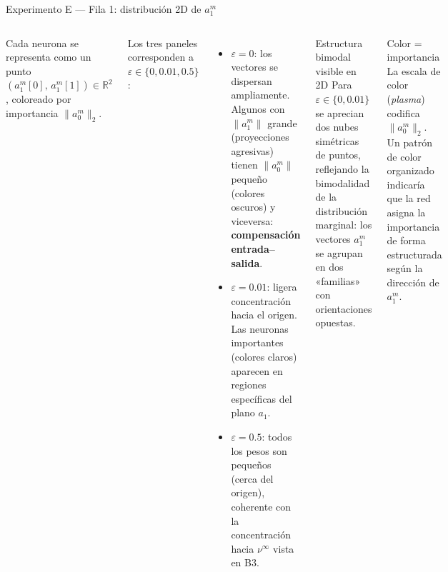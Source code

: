 \documentclass[10pt]{beamer}
\begin{document}
\begin{frame}{Experimento E — Fila 1: distribución 2D de $a_1^m$}

\begin{columns}

Cada neurona se representa como un punto $(a_1^m[0],\, a_1^m[1])\in\mathbb{R}^2$, coloreado por importancia $\|a_0^m\|_2$.

\medskip
Los tres paneles corresponden a $\varepsilon\in\{0, 0.01, 0.5\}$:

\begin{itemize}
  \item \textbf{$\varepsilon=0$}: los vectores se dispersan ampliamente. Algunos con $\|a_1^m\|$ grande (proyecciones agresivas) tienen $\|a_0^m\|$ pequeño (colores oscuros) y viceversa: \textbf{compensación entrada–salida}.
  \medskip
  \item \textbf{$\varepsilon=0.01$}: ligera concentración hacia el origen. Las neuronas importantes (colores claros) aparecen en regiones específicas del plano $a_1$.
  \medskip
  \item \textbf{$\varepsilon=0.5$}: todos los pesos son pequeños (cerca del origen), coherente con la concentración hacia $\nu^\infty$ vista en B3.
\end{itemize}

\begin{block}{Estructura bimodal visible en 2D}
  Para $\varepsilon\in\{0, 0.01\}$ se aprecian dos nubes simétricas de puntos, reflejando la bimodalidad de la distribución marginal: los vectores $a_1^m$ se agrupan en dos «familias» con orientaciones opuestas.
\end{block}
\medskip
\begin{block}{Color = importancia}
  La escala de color (\textit{plasma}) codifica $\|a_0^m\|_2$. Un patrón de color organizado indicaría que la red asigna la importancia de forma estructurada según la dirección de $a_1^m$.
\end{block}
\end{columns}

\end{frame}
\end{document}
